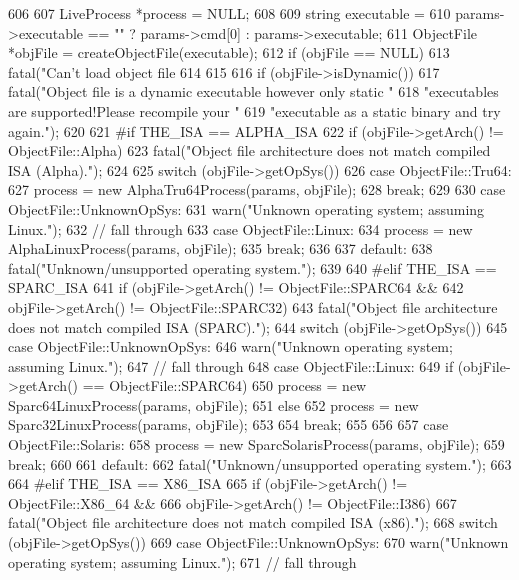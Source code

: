 \begin{DoxyCode}
606 {
607     LiveProcess *process = NULL;
608 
609     string executable =
610         params->executable == "" ? params->cmd[0] : params->executable;
611     ObjectFile *objFile = createObjectFile(executable);
612     if (objFile == NULL) {
613         fatal("Can't load object file %
614     }
615 
616     if (objFile->isDynamic())
617        fatal("Object file is a dynamic executable however only static "
618              "executables are supported!\n       Please recompile your "
619              "executable as a static binary and try again.\n");
620 
621 #if THE_ISA == ALPHA_ISA
622     if (objFile->getArch() != ObjectFile::Alpha)
623         fatal("Object file architecture does not match compiled ISA (Alpha).");
624 
625     switch (objFile->getOpSys()) {
626       case ObjectFile::Tru64:
627         process = new AlphaTru64Process(params, objFile);
628         break;
629 
630       case ObjectFile::UnknownOpSys:
631         warn("Unknown operating system; assuming Linux.");
632         // fall through
633       case ObjectFile::Linux:
634         process = new AlphaLinuxProcess(params, objFile);
635         break;
636 
637       default:
638         fatal("Unknown/unsupported operating system.");
639     }
640 #elif THE_ISA == SPARC_ISA
641     if (objFile->getArch() != ObjectFile::SPARC64 &&
642         objFile->getArch() != ObjectFile::SPARC32)
643         fatal("Object file architecture does not match compiled ISA (SPARC).");
644     switch (objFile->getOpSys()) {
645       case ObjectFile::UnknownOpSys:
646         warn("Unknown operating system; assuming Linux.");
647         // fall through
648       case ObjectFile::Linux:
649         if (objFile->getArch() == ObjectFile::SPARC64) {
650             process = new Sparc64LinuxProcess(params, objFile);
651         } else {
652             process = new Sparc32LinuxProcess(params, objFile);
653         }
654         break;
655 
656 
657       case ObjectFile::Solaris:
658         process = new SparcSolarisProcess(params, objFile);
659         break;
660 
661       default:
662         fatal("Unknown/unsupported operating system.");
663     }
664 #elif THE_ISA == X86_ISA
665     if (objFile->getArch() != ObjectFile::X86_64 &&
666         objFile->getArch() != ObjectFile::I386)
667         fatal("Object file architecture does not match compiled ISA (x86).");
668     switch (objFile->getOpSys()) {
669       case ObjectFile::UnknownOpSys:
670         warn("Unknown operating system; assuming Linux.");
671         // fall through
}}
\end{DoxyCode}
